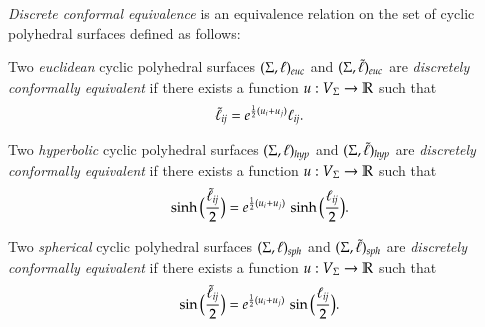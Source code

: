 \documentclass[Thesis]{subfiles}
\begin{document}
\begin{definition}
  \label{def:dconf}
  \emph{Discrete conformal equivalence} is an equivalence relation on
  the set of cyclic polyhedral surfaces defined as follows:
  \begin{compactitem}
  \item Two \emph{euclidean} cyclic polyhedral surfaces
    $(\Sigma,\ell)_{\euc}$ and $(\Sigma,\ellt)_{\euc}$ are
    \emph{discretely conformally equivalent} if there exists a
    function $u:V_{\Sigma}\rightarrow\mathbb R$ such that
    \begin{equation}
      \label{eq:tilde_ell_euc}
      \tilde{\ell}_\mathit{ij}=e^{\frac{1}{2}(u_{i}+u_{j})}\ell_\mathit{ij}.
    \end{equation}
  \item Two \emph{hyperbolic} cyclic polyhedral surfaces
    $(\Sigma,\ell)_{\mathit{hyp}}$ and $(\Sigma,\tilde{\ell})_{\mathit{hyp}}$ are \emph{discretely
      conformally equivalent} if there exists a function
    $u:V_{\Sigma}\rightarrow\mathbb R$ such that
    \begin{equation}
      \label{eq:tilde_ell_hyp}
      \sinh\Big(\frac{\tilde{\ell}_\mathit{ij}}{2}\Big)
      = e^{\frac{1}{2}(u_{i}+u_{j})}\,
      \sinh\Big(\frac{\ell_\mathit{ij}}{2}\Big).
    \end{equation}
  \item Two \emph{spherical} cyclic polyhedral surfaces
    $(\Sigma,\ell)_{\mathit{sph}}$ and $(\Sigma,\tilde{\ell})_{\mathit{sph}}$ are \emph{discretely
      conformally equivalent} if there exists a function
    $u:V_{\Sigma}\rightarrow\mathbb R$ such that
    \begin{equation}
      \label{eq:tilde_ell_sph}
      \sin\Big(\frac{\tilde{\ell}_\mathit{ij}}{2}\Big)
      = e^{\frac{1}{2}(u_{i}+u_{j})}\,
      \sin\Big(\frac{\ell_\mathit{ij}}{2}\Big).
    \end{equation}
  \end{compactitem}


\end{definition}
\end{document}

